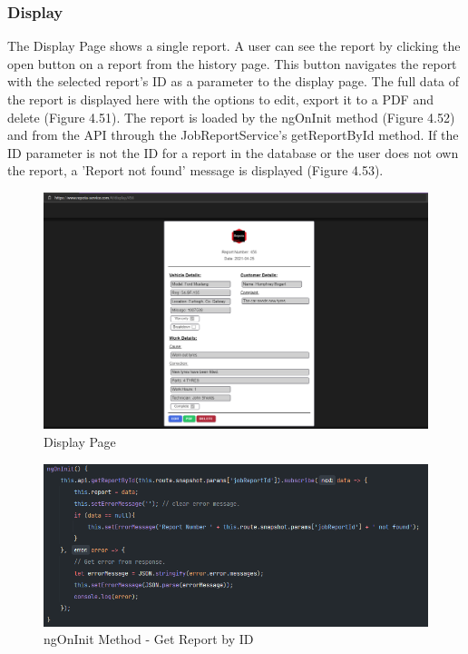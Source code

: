 \subsubsection{Display}
The Display Page shows a single report. A user can see the report by clicking the open button on a report from the history page. This button navigates the report with the selected report's ID as a parameter to the display page. The full data of the report is displayed here with the options to edit, export it to a PDF and delete (Figure 4.51). The report is loaded by the ngOnInit method (Figure 4.52) and from the API through the JobReportService's getReportById method. If the ID parameter is not the ID for a report in the database or the user does not own the report, a 'Report not found' message is displayed (Figure 4.53).  

\begin{figure}[H]
    \caption{Display Page}
    \label{image:displayPage}
    \centering
    \includegraphics[width=1.0\textwidth]{images/repota/UI/display-page.png}
\end{figure}

\begin{figure}[H]
    \caption{ngOnInit Method - Get Report by ID}
    \label{image:ng_reportbyID}
    \centering
    \includegraphics[width=1.0\textwidth]{images/repota/report_pages/display.png}
\end{figure}

